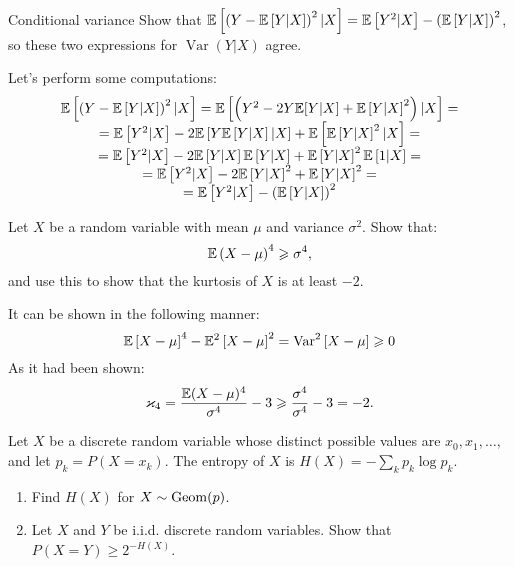 \documentclass[12pt]{report}
\begin{document}
\begin{problem}{Conditional variance}
    Show that $\mathbb{E}\left[\left(Y - \mathbb{E}\left[Y|X\right]\right)^2 | X\right] = \mathbb{E}\left[Y^2 | X\right] - \left(\mathbb{E}\left[Y|X\right]\right)^2$, so these two expressions for $\operatorname{Var}(Y|X)$ agree. 
\end{problem}

\begin{solution}
    Let's perform some computations:
    \[
        \begin{array}{c}
            \mathbb{E}\left[\left(Y - \mathbb{E}\left[Y|X\right]\right)^2 | X\right]  = \mathbb{E}\left[\left(Y^2 - 2Y\mathbb{E}[Y|X] +  \mathbb{E}\left[Y|X\right]^2\right)| X\right] = \\
            = \mathbb{E} \left[Y^2 | X\right] - 2 \mathbb{E}\left[Y\mathbb{E}\left[Y|X\right]|X\right] + \mathbb{E} \left[\mathbb{E}\left[Y|X\right]^2 | X\right] = \\
            = \mathbb{E} \left[Y^2 | X\right] - 2\mathbb{E}\left[Y | X\right] \mathbb{E}\left[Y | X\right] + \mathbb{E}\left[Y|X\right]^2 \mathbb{E} \left[1 | X\right] = \\
            = \mathbb{E} \left[Y^2 | X\right] - 2\mathbb{E}\left[Y|X\right]^2 + \mathbb{E}\left[Y|X\right]^2 = \\
            = \mathbb{E}\left[Y^2 | X\right] - \left(\mathbb{E}\left[Y|X\right]\right)^2
        \end{array}  
    \]
\end{solution}

\begin{problem}{}
    Let $X$ be a random variable with mean $\mu$ and variance $\sigma^2$. Show that:
    \[
        \mathbb{E} \left(X - \mu\right)^4 \geqslant \sigma^4,  
    \]
    and use this to show that the kurtosis of $X$ is at least $-2$.
\end{problem}

\begin{solution}
    It can be shown in the following manner:
    \[
        \mathbb{E}\left[X - \mu\right]^4 - \mathbb{E}^2 \left[X - \mu\right]^2 = \operatorname{Var}^2 \left[X - \mu\right] \geqslant 0
    \]
    As it had been shown:
    \[
        \varkappa_4 = \dfrac{\mathbb{E}(X- \mu)^4}{\sigma^4} - 3 \geqslant \dfrac{\sigma^4}{\sigma^4} - 3 = -2.  
    \]
\end{solution}

\begin{problem}{}
   Let $X$ be a discrete random variable whose distinct possible values are $x_0, x_1, \ldots,$ and let $p_k = P(X = x_k)$. The entropy of $X$ is $H(X) = -\sum\limits_{k} p_k\log p_k$.
   \begin{enumerate}
    \item Find $H(X)$ for $X \sim \operatorname{Geom}(p)$.
    \item Let $X$ and $Y$ be i.i.d. discrete random variables. Show that $P(X = Y) \geq 2^{-H(X)}$.
   \end{enumerate}
\end{problem}
\end{document}
